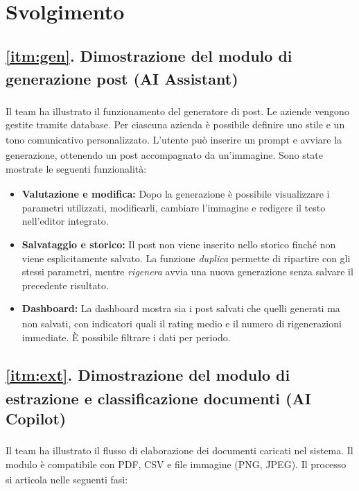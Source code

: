 \documentclass[a4paper,12pt]{article}
\newcommand{\G}{\textsubscript{\scalebox{0.6}{\textbf{G}}}\xspace}
\begin{document}
\newpage
\section{Svolgimento}

\subsection*{\ref{itm:gen}. Dimostrazione del modulo\G di generazione post (AI\G Assistant)}

Il team ha illustrato il funzionamento del generatore di post. Le aziende vengono gestite tramite database\G. Per ciascuna azienda è possibile definire uno stile e un tono comunicativo personalizzato. L'utente può inserire un prompt\G e avviare la generazione, ottenendo un post accompagnato da un'immagine. Sono state mostrate le seguenti funzionalità\G:

\begin{itemize}
    \item \textbf{Valutazione e modifica:} Dopo la generazione è possibile visualizzare i
    parametri utilizzati, modificarli, cambiare l'immagine e redigere il testo nell'editor
    integrato.
    \item \textbf{Salvataggio e storico:} Il post non viene inserito nello storico finché
    non viene esplicitamente salvato. La funzione \textit{duplica} permette di ripartire
    con gli stessi parametri, mentre \textit{rigenera} avvia una nuova generazione senza
    salvare il precedente risultato.
    \item \textbf{Dashboard:} La dashboard\G mostra sia i post salvati che quelli generati
    ma non salvati, con indicatori quali il rating medio e il numero di rigenerazioni
    immediate. È possibile filtrare i dati per periodo.
\end{itemize}

\subsection*{\ref{itm:ext}. Dimostrazione del modulo\G di estrazione e classificazione documenti (AI Copilot\G)}

Il team ha illustrato il flusso di elaborazione dei documenti caricati nel sistema. Il
modulo\G è compatibile con PDF\G, CSV e file immagine (PNG, JPEG). Il processo si articola
nelle seguenti fasi:
\end{document}
